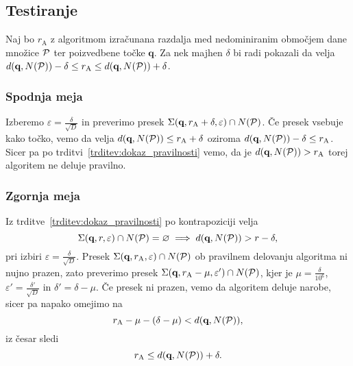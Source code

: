 \subsection{Testiranje}
Naj bo $r_{\text{A}}$ z algoritmom izračunana razdalja med nedominiranim območjem dane množice $\P$ ter poizvedbene točke $\textbf{q}$. Za nek majhen $\delta$ bi radi pokazali da velja $d(\textbf{q}, N(\P)) - \delta \leq r_\text{A} \leq d(\textbf{q}, N(\P)) + \delta$. 

\subsubsection{Spodnja meja}
Izberemo $\varepsilon = \frac{\delta}{\sqrt{D}}$ in preverimo presek $\Sigma(\textbf{q}, r_{\text{A}} + \delta, \varepsilon) \cap N(\P)$. Če presek vsebuje kako točko, vemo da velja $d(\textbf{q}, N(\P)) \leq r_\text{A} + \delta$ oziroma $d(\textbf{q}, N(\P)) - \delta \leq r_\text{A}$. Sicer pa po trditvi~\ref{trditev:dokaz_pravilnosti} vemo, da je $d(\textbf{q}, N(\P)) > r_\text{A}$ torej algoritem ne deluje pravilno. 

\subsubsection{Zgornja meja}
Iz trditve~\ref{trditev:dokaz_pravilnosti} po kontrapoziciji velja
\[
\Sigma(\textbf{q}, r, \varepsilon) \cap N(\P) = \varnothing \implies d(\textbf{q}, N(\P)) > r - \delta,
\]
pri izbiri $\varepsilon = \frac{\delta}{\sqrt{D}}$. Presek $\Sigma(\textbf{q}, r_\text{A}, \varepsilon) \cap N(\P)$ ob pravilnem delovanju algoritma ni nujno prazen, zato preverimo presek $\Sigma(\textbf{q}, r_\text{A} - \mu, \varepsilon') \cap N(\P)$, kjer je $\mu = \frac{\delta}{10^6}$, $\varepsilon' = \frac{\delta'}{\sqrt{D}}$ in $\delta' = \delta - \mu$. Če presek ni prazen, vemo da algoritem deluje narobe, sicer pa napako omejimo na
\[
r_\text{A} - \mu - (\delta - \mu) < d(\textbf{q}, N(\P)),
\]
iz česar sledi
\[
r_\text{A} \leq d(\textbf{q}, N(\P)) + \delta.
\]

